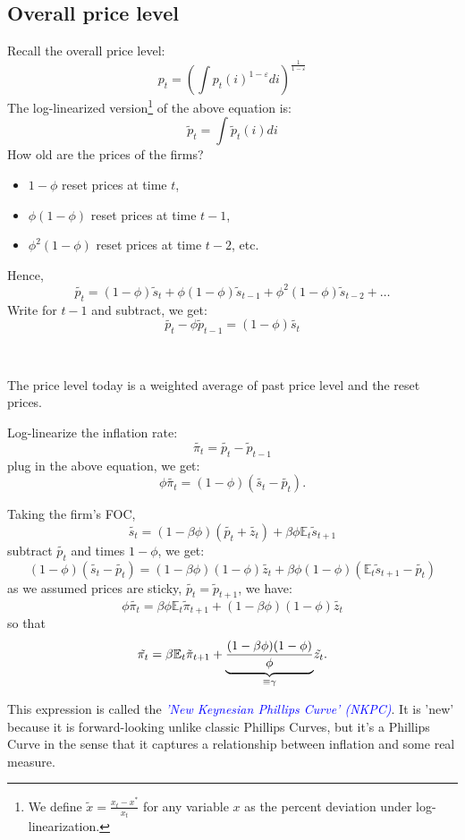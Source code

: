 \subsection{Overall price level}
Recall the overall price level:
\[
p_t = \left( \int p_t(i)^{1-\varepsilon} di \right)^{\frac{1}{1-\varepsilon}}
\]
The log-linearized version\footnote{We define $\tilde{x} = \frac{x_{t}-x^*}{x_t}$ for any variable $x$ as the percent deviation under log-linearization.} of the above equation is:
\[
\tilde{p}_t = \int \tilde{p}_t(i)di
\]
How old are the prices of the firms?
\begin{itemize}
    \item $1-\phi$ reset prices at time $t$,
    \item $\phi(1-\phi)$ reset prices at time $t-1$,
    \item $\phi^2(1-\phi)$ reset prices at time $t-2$, etc.
\end{itemize}
Hence,
\[
\tilde{p_t} = (1-\phi)\tilde{s}_t + \phi(1-\phi)\tilde{s}_{t-1} + \phi^2(1-\phi)\tilde{s}_{t-2} + \ldots
\]
Write for $t-1$ and subtract, we get:
\[\tilde{p_t} - \phi \tilde{p}_{t-1} = (1-\phi)\tilde{s_t}\]

\begin{note}
    \ 

    The price level today is a weighted average of past price level and the reset prices.
\end{note}

Log-linearize the inflation rate:
\[\tilde{\pi_t} = \tilde{p_t} - \tilde{p}_{t-1}\]
plug in the above equation, we get:
\[\phi \tilde{\pi _t} = (1-\phi)(\tilde{s_t} - \tilde{p_t}).\]

Taking the firm's FOC,
\[\tilde{s_t} = (1-\beta \phi )(\tilde{p_t} + \tilde{z_t}) + \beta \phi \mathbb{E}_t \tilde{s}_{t+1} \]
subtract $\tilde{p_t}$ and times $1-\phi $, we get:
\[(1-\phi )(\tilde{s_t} - \tilde{p_t}) = (1-\beta \phi)(1-\phi)\tilde{z_t} + \beta \phi (1-\phi)(\mathbb{E}_t \tilde{s}_{t+1} - \tilde{p_t}) \]
as we assumed prices are sticky, $\tilde{p_t} = \tilde{p}_{t+1} $, we have:
\[\phi \tilde{\pi _t} = \beta \phi \mathbb{E}_t \tilde{\pi}_{t+1} + (1-\beta \phi)(1-\phi)\tilde{z_t}\]
so that
\[\tilde{\pi _t} = \beta \mathbb{E}_t \tilde{\pi}_{t+1} + \underset{\equiv \gamma}{\underbrace{\frac{(1-\beta \phi)(1-\phi)}{\phi}}} \tilde{z_t}\protect\label{NKPC1}.\]

This expression is called the \textcolor{blue}{\textit{'New Keynesian Phillips Curve' (NKPC)}}.
It is 'new' because it is forward-looking unlike classic Phillips Curves, 
but it's a Phillips Curve in the sense that it captures a relationship between inflation and some real measure. 

